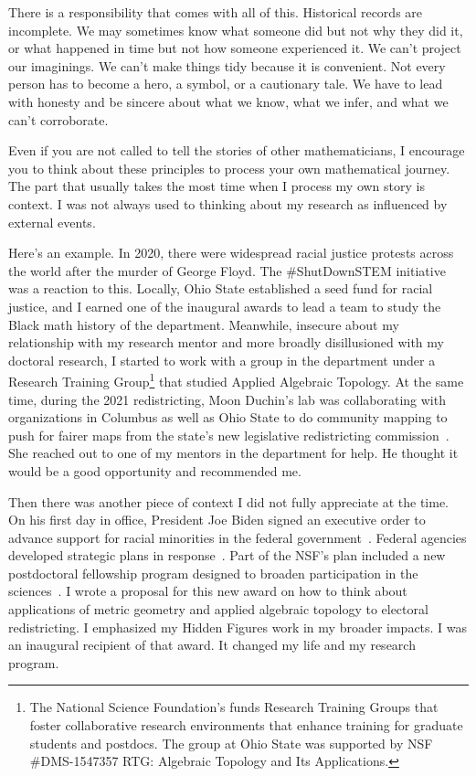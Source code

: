 \documentclass[pdflatex,sn-mathphys-num]{sn-jnl}%
\begin{document}
There is a responsibility that comes with all of this. Historical records are incomplete. We may sometimes know what someone did but not why they did it, or what happened in time but not how someone experienced it. We can't project our imaginings. We can't make things tidy because it is convenient. Not every person has to become a hero, a symbol, or a cautionary tale. We have to lead with honesty and be sincere about what we know, what we infer, and what we can't corroborate. 

Even if you are not called to tell the stories of other mathematicians, I encourage you to think about these principles to process your own mathematical journey. The part that usually takes the most time when I process my own story is context. I was not always used to thinking about my research as influenced by external events.

Here's an example. In 2020, there were widespread racial justice protests across the world after the murder of George Floyd. The \#ShutDownSTEM initiative was a reaction to this. Locally, Ohio State established a seed fund for racial justice, and I earned one of the inaugural awards to lead a team to study the Black math history of the department. Meanwhile, insecure about my relationship with my research mentor and more broadly disillusioned with my doctoral research,  I started to work with a group in the department under a Research Training Group\footnote{The National Science Foundation's funds Research Training Groups that foster collaborative research environments that enhance training for graduate students and postdocs. The group at Ohio State was supported by NSF \#DMS-1547357 RTG: Algebraic Topology and Its Applications.} that studied Applied Algebraic Topology. At the same time, during the 2021 redistricting, Moon Duchin's lab was collaborating with organizations in Columbus as well as Ohio State to do community mapping to push for fairer maps from the state's new legislative redistricting commission~\cite{chambers2021ohio,mggg2021cois}. She reached out to one of my mentors in the department for help. He thought it would be a good opportunity and recommended me.

Then there was another piece of context I did not fully appreciate at the time. On his first day in office, President Joe Biden signed an executive order to advance support for racial minorities in the federal government~\cite{biden2021executive}. Federal agencies developed strategic plans in response~\cite{nsf2021equity}. Part of the NSF's plan included a new postdoctoral fellowship program designed to broaden participation in the sciences~\cite{nsf2021mpsascend}. I wrote a proposal for this new award on how to think about applications of metric geometry and applied algebraic topology to electoral redistricting. I emphasized my Hidden Figures work in my broader impacts. I was an inaugural recipient of that award. It changed my life and my research program. 
\end{document}
